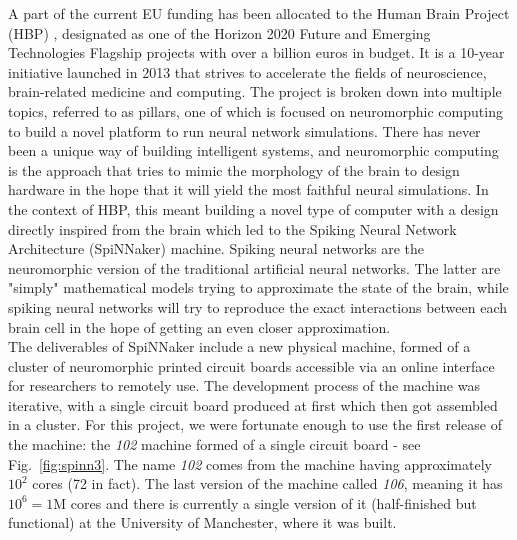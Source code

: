 A part of the current EU funding has been allocated to the Human Brain Project (HBP) \cite{hbp}, designated as one of the Horizon 2020 Future and Emerging Technologies Flagship projects with over a billion euros in budget. It is a 10-year initiative launched in 2013 that strives to accelerate the fields of neuroscience, brain-related medicine and computing. The project is broken down into multiple topics, referred to as pillars, one of which is focused on neuromorphic computing to build a novel platform to run neural network simulations. There has never been a unique way of building intelligent systems, and neuromorphic computing is the approach that tries to mimic the morphology of the brain to design hardware in the hope that it will yield the most faithful neural simulations. In the context of HBP, this meant building a novel type of computer with a design directly inspired from the brain which led to the Spiking Neural Network Architecture (SpiNNaker) machine\cite{SpiNNaker-Project}. Spiking neural networks are the neuromorphic version of the traditional artificial neural networks. The latter are "simply" mathematical models trying to approximate the state of the brain, while spiking neural networks will try to reproduce the exact interactions between each brain cell in the hope of getting an even closer approximation. \\

The deliverables of SpiNNaker include a new physical machine, formed of a cluster of neuromorphic printed circuit boards accessible via an online interface for researchers to remotely use. The development process of the machine was iterative, with a single circuit board produced at first which then got assembled in a cluster. For this project, we were fortunate enough to use the first release of the machine: the \textit{102} machine formed of a single circuit board - see Fig.~\ref{fig:spinn3}. The name \textit{102} comes from the machine having approximately $10^2$ cores (72 in fact). The last version of the machine called \textit{106}, meaning it has $10^6 = 1$M cores and there is currently a single version of it (half-finished but functional) at the University of Manchester, where it was built. \\

